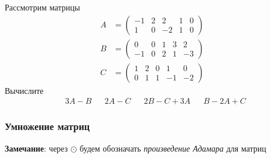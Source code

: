 \begin{exercise}
Рассмотрим матрицы
\begin{align*}
	A&=\begin{pmatrix}
		-1 & 2 & 2 & 1 & 0 \\ 1 & 0 & -2 & 1 & 0
	\end{pmatrix} \\
	B&=\begin{pmatrix}
		0 & 0 & 1 & 3 & 2 \\ -1 & 0 & 2 & 1 & -3
	\end{pmatrix} \\
	C&=\begin{pmatrix}
		1 & 2 & 0 & 1 & 0 \\ 0 & 1 & 1 & -1 & -2
	\end{pmatrix}
\end{align*}
Вычислите
\begin{align*}
	& 3A-B & &2A-C & &2B-C+3A & &B-2A+C
\end{align*}
\end{exercise}

\subsubsection{Умножение матриц}

\textbf{Замечание}: через \(\odot\) будем обозначать \textit{произведение Адамара} для матриц

